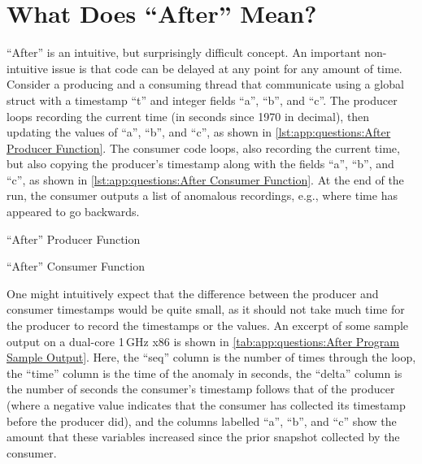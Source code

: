 
\section{What Does ``After'' Mean?}
\label{sec:app:questions:What Does ``After'' Mean?}

``After'' is an intuitive, but surprisingly difficult concept.
An important non-intuitive issue is that code can be delayed at
any point for any amount of time.
Consider a producing and a consuming thread that communicate using
a global struct with a timestamp ``t'' and integer fields ``a'', ``b'',
and ``c''.
The producer loops recording the current time
(in seconds since 1970 in decimal),
then updating the values of ``a'', ``b'', and ``c'',
as shown in \cref{lst:app:questions:After Producer Function}.
The consumer code loops, also recording the current time, but also
copying the producer's timestamp along with the fields ``a'',
``b'', and ``c'', as shown in
\cref{lst:app:questions:After Consumer Function}.
At the end of the run, the consumer outputs a list of anomalous recordings,
e.g., where time has appeared to go backwards.

\begin{listing}[htbp]

\caption{``After'' Producer Function}
\label{lst:app:questions:After Producer Function}
\end{listing}

\begin{listing}[htbp]

\caption{``After'' Consumer Function}
\label{lst:app:questions:After Consumer Function}
\end{listing}

\QuickQuizEnd

One might intuitively expect that the difference between the producer
and consumer timestamps would be quite small, as it should not take
much time for the producer to record the timestamps or the values.
An excerpt of some sample output on a dual-core 1\,GHz x86 is shown in
\cref{tab:app:questions:After Program Sample Output}.
Here, the ``seq'' column is the number of times through the loop,
the ``time'' column is the time of the anomaly in seconds, the ``delta''
column is the number of seconds the consumer's timestamp follows that
of the producer (where a negative value indicates that the consumer
has collected its timestamp before the producer did), and the
columns labelled ``a'', ``b'', and ``c'' show the amount that these
variables increased since the prior snapshot collected by the consumer.


